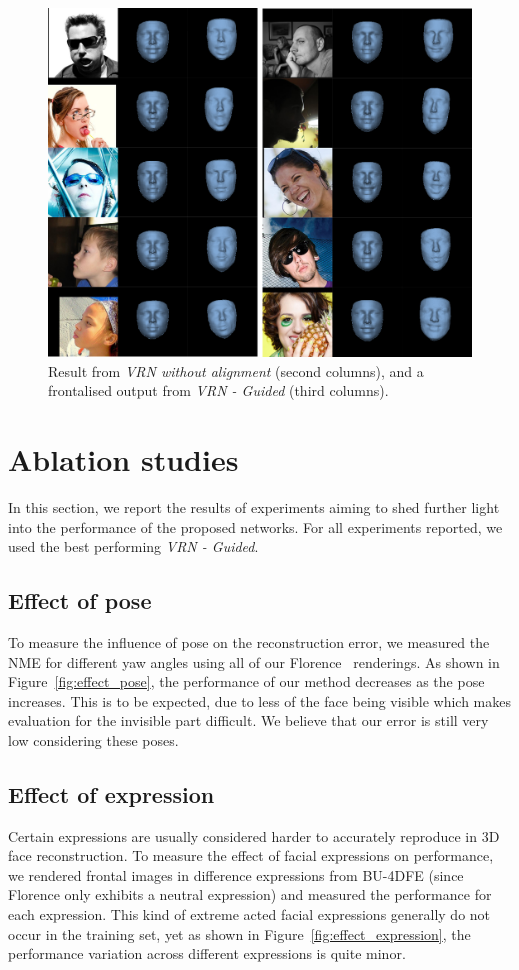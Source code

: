 \begin{figure}
  \centering
  \includegraphics[width=0.7\linewidth]{img/frontal.png}
  \caption[Visual results when spatial alignment is ignored]{Result from
    \textit{VRN without alignment} (second columns), and a frontalised
    output from \textit{VRN - Guided} (third columns).}
  \label{fig:frontal_visual}
\end{figure}

\section{Ablation studies}
\label{chapter:face:sec:ablation}

In this section, we report the results of experiments aiming to shed
further light into the performance of the proposed networks. For all
experiments reported, we used the best performing \textit{VRN -
  Guided}.

\subsection{Effect of pose}
To measure the influence of pose on the reconstruction error, we
measured the NME for different yaw angles using all of our
Florence~\cite{masi2d3dFaceData} renderings. As shown in
Figure~\ref{fig:effect_pose}, the performance of our method decreases as
the pose increases. This is to be expected, due to less of the face
being visible which makes evaluation for the invisible part
difficult. We believe that our error is still very low considering
these poses.


\subsection{Effect of expression} Certain expressions are usually
considered harder to accurately reproduce in 3D face
reconstruction. To measure the effect of facial expressions on
performance, we rendered frontal images in difference expressions from
BU-4DFE (since Florence only exhibits a neutral expression) and
measured the performance for each expression. This kind of extreme
acted facial expressions generally do not occur in the training set,
yet as shown in Figure~\ref{fig:effect_expression}, the performance
variation across different expressions is quite minor.

